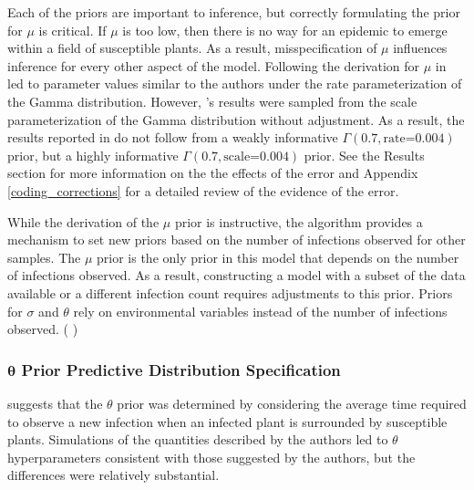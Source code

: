 \documentclass{uwstat572}
\newcommand{\vmcomment}[1]{({\color{blue}{VM's comment:}} \textbf{\color{blue}{#1}})}
\begin{document}
Each of the priors are important to inference, but correctly formulating the prior for $\mu$ is critical. 
If $\mu$ is too low, then there is no way for an epidemic to emerge within a field of susceptible plants. 
As a result, misspecification of $\mu$ influences inference for every other aspect of the model. 
Following the derivation for $\mu$ in \citet{Brown} led to parameter values similar to the authors under the rate parameterization of the Gamma distribution. 
However, \citep{Brown}'s results were sampled from the scale parameterization of the Gamma distribution without adjustment.
As a result, the results reported in \citet{Brown} do not follow from a weakly informative $\Gamma(0.7, \text{rate=}0.004)$ prior, but a highly informative $\Gamma(0.7, \text{scale=}0.004)$ prior. 
See the Results section for more information on the the effects of the error and Appendix \ref{coding_corrections} for a detailed review of the evidence of the error.  

While the derivation of the $\mu$ prior is instructive, the algorithm provides a mechanism to set new priors based on the number of infections observed for other samples. 
The $\mu$ prior is the only prior in this model that depends on the number of infections observed. 
As a result, constructing a model with a subset of the data available or a different infection count requires adjustments to this prior. 
Priors for $\sigma$ and $\theta$ rely on environmental variables instead of the number of infections observed.
\vmcomment{Not sure I understand what you mean by the ``environmental variables". Have you defined them before?}

\subsubsection{$\boldsymbol{\theta}$ Prior Predictive Distribution Specification}
\citet{Brown} suggests that the $\theta$ prior was determined by considering the average time required to observe a new infection when an infected plant is surrounded by susceptible plants. 
Simulations of the quantities described by the authors led to $\theta$ hyperparameters consistent with those suggested by the authors, but the differences were relatively substantial.
\end{document}
